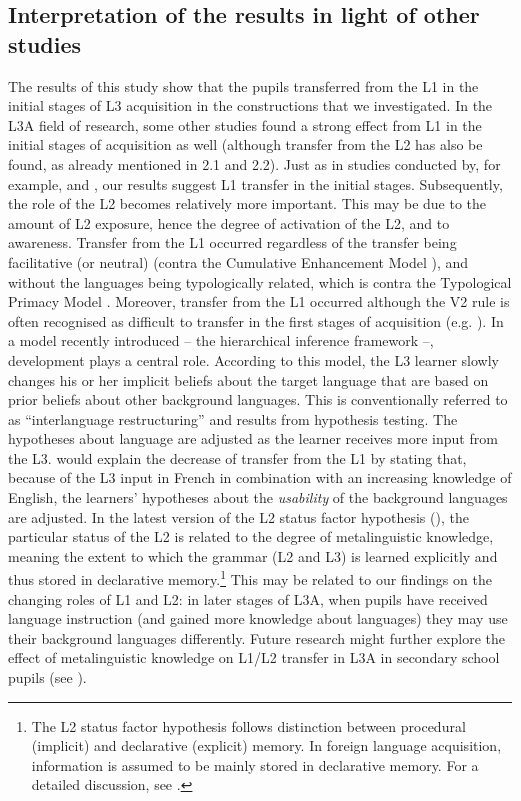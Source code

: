 \documentclass[output=paper]{langsci/langscibook}
\begin{document}
\subsection{Interpretation of the results in light of other studies}%
\label{sec:stadt:5.2}
The results of this study show that the pupils transferred from the L1 in the initial stages of L3 acquisition in the constructions that we investigated. In the L3A field of research, some other studies found a strong effect from L1 in the initial stages of acquisition as well (although transfer from the L2 has also be found, as already mentioned in 2.1 and 2.2). Just as in studies conducted by, for example, \citet{NaRanongLeung2009} and \citet{Hermas2010, Hermas2014Morphosyntax, Hermas2014Relatives}, our results suggest L1 transfer in the initial stages. Subsequently, the role of the L2 becomes relatively more important. This may be due to the amount of L2 exposure, hence the degree of activation of the L2, and to awareness.
Transfer from the L1 occurred regardless of the transfer being facilitative (or neutral) (contra the Cumulative Enhancement Model \citealt{FlynnEtAl2004}), and without the languages being typologically related, which is contra the Typological Primacy Model \citep{Rothman2010, Rothman2011, Rothman2015}. Moreover, transfer from the L1 occurred although the V2 rule is often recognised as difficult to transfer in the first stages of acquisition (e.g. \citealt{Pienemann1998}). In a model recently introduced – the hierarchical inference framework \citep{PajakEtAl2016} –, development plays a central role. According to this model, the L3 learner slowly changes his or her implicit beliefs about the target language that are based on prior beliefs about other background languages. This is conventionally referred to as ``interlanguage restructuring'' and results from hypothesis testing. The hypotheses about language are adjusted as the learner receives more input from the L3. \citet{PajakEtAl2016} would explain the decrease of transfer from the L1 by stating that, because of the L3 input in French in combination with an increasing knowledge of English, the learners’ hypotheses about the \textit{usability} of the background languages are adjusted.
In the latest version of the L2 status factor hypothesis (\citealt{BardelSánchez2017}), the particular status of the L2 is related to the degree of metalinguistic knowledge, meaning the extent to which the grammar (L2 and L3) is learned explicitly and thus stored in declarative memory.\footnote{The L2 status factor hypothesis follows  distinction between procedural (implicit) and declarative (explicit) memory. In foreign language acquisition, information is assumed to be mainly stored in declarative memory. For a detailed discussion, see \citet{BardelSánchez2017}.} This may be related to our findings on the changing roles of L1 and L2: in later stages of L3A, when pupils have received language instruction (and gained more knowledge about languages) they may use their background languages differently. Future research might further explore the effect of metalinguistic knowledge on L1/L2 transfer in L3A in secondary school pupils (see \citealt{FalkEtAl2015}).
\end{document}
